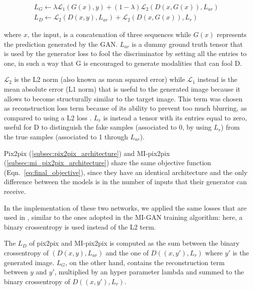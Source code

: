 \begin{equation} \label{eq:losses_migan}
\begin{gathered}
L_G\leftarrow \lambda\mathcal{L}_{1}(G(x), y) + (1 - \lambda) \mathcal{L}_{2}(D(x, G(x)), L_{ar})  \\
L_D \leftarrow \mathcal{L}_{2}(D(x, y), L_{ar}) + \mathcal{L}_{2}(D(x, G(x)), L_r) 
\end{gathered}
\end{equation}

where $x$, the input, is a concatenation of three sequences while $G(x)$ represents the prediction generated by the \ac{GAN}.
$L_{ar}$ is a dummy ground truth tensor that is used by the generator loss to fool the discriminator by setting all the entries to one, in such a way that G is encouraged to generate modalities that can fool D.

$\mathcal{L}_{2}$ is the L2 norm (also known as mean squared error) while $\mathcal{L}_{1}$ instead is the mean absolute error (L1 norm) that is useful to the generated image because it allows to become structurally similar to the target image. This term was chosen as reconstruction loss term because of its ability to prevent too much blurring, as compared to using a L2 loss \cite{migan}.
$L_r$ is instead a tensor with its entries equal to zero, useful for D to distinguish the fake samples (associated to 0, by using $L_{r}$) from the true samples (associated to 1 through $L_{ar}$).

\vspace{5mm} %
Pix2pix (\ref{subsec:pix2pix_architecture}) and MI-pix2pix (\ref{subsec:mi_pix2pix_architecture}) share the same objective function (Eqn.~\ref{eq:final_objective}), since they have an identical architecture and the only difference between the models is in the number of inputs that their generator can receive.

In the implementation of these two networks, we applied the same losses that are used in \cite{pix2pix_implementation}, similar to the ones adopted in the MI-GAN training algorithm: here, a binary crossentropy is used instead of the L2 term. 

The $L_D$ of pix2pix and MI-pix2pix is computed as the sum between the binary crossentropy of $(D(x,y), L_{ar})$ and the one of $D((x, y'), L_{r})$ where $y'$ is the generated image.
$L_G$, on the other hand, contains the reconstruction term between $y$ and $y'$, multiplied by an hyper parameter lambda and summed to the binary crossentropy of $D((x, y'), L_{r})$.

